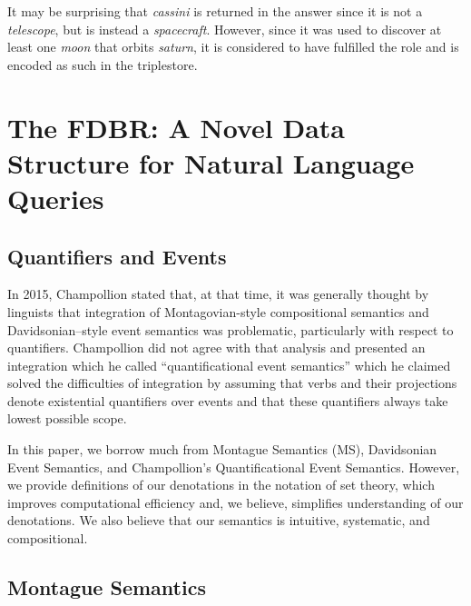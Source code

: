 \documentclass[../main.tex]{subfiles}
\begin{document}
\begin{refsection}
\examplespacing


\examplespacing

\noindent It may be surprising that \textit{cassini} is returned in the answer since it is not a \textit{telescope}, but is instead a \textit{spacecraft}.  However, since it was used to discover at least one \textit{moon} that orbits \textit{saturn}, it is considered to have fulfilled the  role and is encoded as such in the triplestore.

\section{The FDBR: A Novel Data Structure for Natural Language Queries}
\label{webist2019journal:album}

\subsection{Quantifiers and Events}
\label{webist2019journal:quant}
In 2015, Champollion \cite{champollion2015interaction} stated that, at that time, it was generally thought by linguists that integration of Montagovian-style compositional semantics and Davidsonian–style event semantics \cite{parsons1990events,davidson1967logical} was problematic, particularly with respect to quantifiers. Champollion did not agree with that analysis and presented an integration which he called ``quantificational event semantics'' which he claimed solved the difficulties of integration by assuming that verbs and their projections denote existential quantifiers over events and that these quantifiers always take lowest possible scope.

In this paper, we borrow much from Montague Semantics (MS), Davidsonian Event Semantics,
and Champollion's Quantificational Event Semantics. However, we provide definitions of our
denotations in the notation of set theory, which improves computational efficiency and, we
believe, simplifies understanding of our denotations. We also believe that our semantics is
intuitive, systematic, and compositional.

\subsection{Montague Semantics}


\end{refsection}
\end{document}

